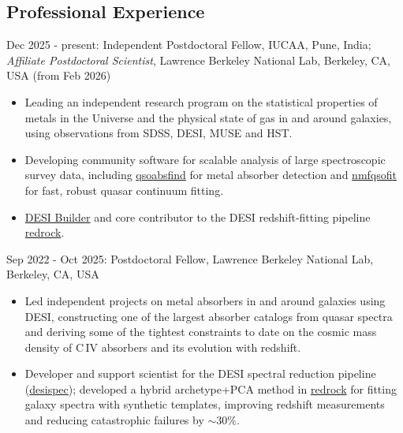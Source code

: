 \documentclass[11pt,letterpaper]{article}
\begin{document}
\subsection{Professional Experience}
\begin{list}{}{\cvlist}

\item Dec 2025 - present: Independent Postdoctoral Fellow, IUCAA, Pune, India; \textit{Affiliate Postdoctoral Scientist}, Lawrence Berkeley National Lab, Berkeley, CA, USA (from Feb 2026) \\

\begin{itemize}
  \item Leading an independent research program on the statistical properties of metals in the Universe and the physical state of gas in and around galaxies, using observations from SDSS, DESI, MUSE and HST.

  \item Developing community software for scalable analysis of large spectroscopic survey data, including \href{https://github.com/abhi0395/qsoabsfind}{qsoabsfind} for metal absorber detection and \href{https://github.com/abhi0395/nmfqsofit}{nmfqsofit} for fast, robust quasar continuum fitting.

  \item \href{https://www.desi.lbl.gov/collaboration/desi-builders/}{DESI Builder} and core contributor to the DESI redshift-fitting pipeline \href{https://github.com/desihub/redrock}{redrock}.

  \vspace{-1mm}
\end{itemize}

\item Sep 2022 - Oct 2025: Postdoctoral Fellow, Lawrence Berkeley National Lab, Berkeley, CA, USA \\
\begin{itemize}
  \item Led independent projects on metal absorbers in and around galaxies using DESI, constructing one of the largest absorber catalogs from quasar spectra and deriving some of the tightest constraints to date on the cosmic mass density of C\,IV absorbers and its evolution with redshift.

  \item Developer and support scientist for the DESI spectral reduction pipeline (\href{https://github.com/desihub/desispec}{desispec}); developed a hybrid archetype+PCA method in \href{https://github.com/desihub/redrock}{redrock} for fitting galaxy spectra with synthetic templates, improving redshift measurements and reducing catastrophic failures by $\sim 30\%$.


\end{itemize}
\end{list}
\end{document}
